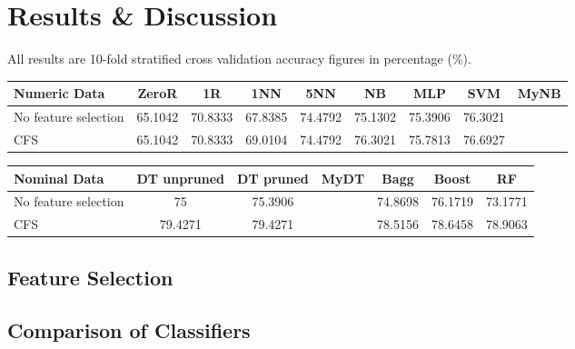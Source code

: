\section{Results \& Discussion}


All results are 10-fold stratified cross validation accuracy figures in percentage (\%).

\begin{tabular}{|m{2cm}*{8}{|c}|}
    \hline
    Numeric Data & ZeroR & 1R & 1NN &5NN &NB &MLP &SVM & MyNB \\
    \hline
    No feature selection & 65.1042 &70.8333 &67.8385 &74.4792 &75.1302 &75.3906 &76.3021 \\
    \hline
    CFS & 65.1042 &70.8333 &69.0104 &74.4792 &76.3021 &75.7813&76.6927 \\
    \hline
\end{tabular}

\begin{tabular}{|m{2cm}*{6}{|c}|}
    \hline
    Nominal Data & DT unpruned &DT pruned &MyDT &Bagg &Boost &RF \\
    \hline
    No feature selection &75 & 75.3906 & &74.8698&76.1719&73.1771 \\
    \hline
    CFS & 79.4271 & 79.4271 & & 78.5156 & 78.6458 & 78.9063 \\
    \hline
\end{tabular}

\begin{obeylines}
    
    
\end{obeylines}


\subsection{Feature Selection}


\subsection{Comparison of Classifiers}


